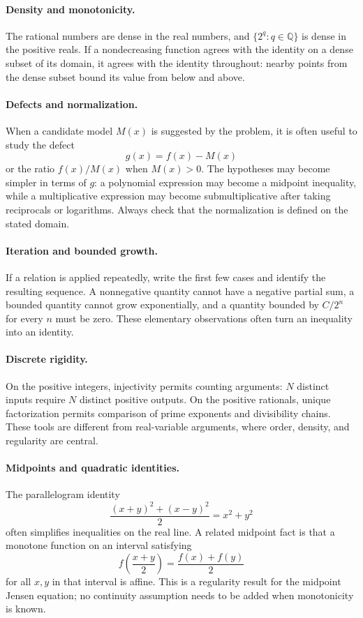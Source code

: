 \documentclass[12pt,a4paper]{article}
\begin{document}
\paragraph{Density and monotonicity.}
The rational numbers are dense in the real numbers, and
$\{2^q:q\in\mathbb Q\}$ is dense in the positive reals. If a nondecreasing
function agrees with the identity on a dense subset of its domain, it agrees
with the identity throughout: nearby points from the dense subset bound its
value from below and above.

\paragraph{Defects and normalization.}
When a candidate model $M(x)$ is suggested by the problem, it is often useful
to study the defect
\[
g(x)=f(x)-M(x)
\]
or the ratio $f(x)/M(x)$ when $M(x)>0$. The hypotheses may become simpler in
terms of $g$: a polynomial expression may become a midpoint inequality, while
a multiplicative expression may become submultiplicative after taking
reciprocals or logarithms. Always check that the normalization is defined on
the stated domain.

\paragraph{Iteration and bounded growth.}
If a relation is applied repeatedly, write the first few cases and identify
the resulting sequence. A nonnegative quantity cannot have a negative partial
sum, a bounded quantity cannot grow exponentially, and a quantity bounded by
$C/2^n$ for every $n$ must be zero. These elementary observations often turn
an inequality into an identity.

\paragraph{Discrete rigidity.}
On the positive integers, injectivity permits counting arguments: $N$
distinct inputs require $N$ distinct positive outputs. On the positive
rationals, unique factorization permits comparison of prime exponents and
divisibility chains. These tools are different from real-variable arguments,
where order, density, and regularity are central.

\paragraph{Midpoints and quadratic identities.}
The parallelogram identity
\[
\frac{(x+y)^2+(x-y)^2}{2}=x^2+y^2
\]
often simplifies inequalities on the real line. A related midpoint fact is
that a monotone function on an interval satisfying
\[
f\!\left(\frac{x+y}{2}\right)=\frac{f(x)+f(y)}2
\]
for all $x,y$ in that interval is affine. This is a regularity result for the midpoint Jensen
equation; no continuity assumption needs to be added when monotonicity is
known.
\end{document}
